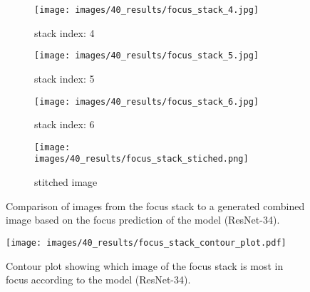 \begin{figure}
    \centering
    \begin{subfigure}[b]{\textwidth}
        \centering
        \caption{stack index: 4}
        \texttt{[image: images/40\_results/focus\_stack\_4.jpg]}
        \label{fig:Results:Stack:SideBySide:Index0}
    \end{subfigure}
    \begin{subfigure}[b]{\textwidth}
        \centering
        \caption{stack index: 5}
        \texttt{[image: images/40\_results/focus\_stack\_5.jpg]}
        \label{fig:Results:Stack:SideBySide:Index1}
    \end{subfigure}
    \begin{subfigure}[b]{\textwidth}
        \centering
        \caption{stack index: 6}
        \texttt{[image: images/40\_results/focus\_stack\_6.jpg]}
        \label{fig:Results:Stack:SideBySide:Index2}
    \end{subfigure}
    \begin{subfigure}[b]{\textwidth}
        \centering
        \caption{stitched image}
        \texttt{[image: images/40\_results/focus\_stack\_stiched.png]}
        \label{fig:Results:Stack:SideBySide:Stiched}
    \end{subfigure}
    \caption{Comparison of images from the focus stack to a generated combined image based on the focus prediction of the model (ResNet-34).}
    \label{fig:Results:Stack:SideBySide}
\end{figure}

\begin{figure}
    \centering
    \texttt{[image: images/40\_results/focus\_stack\_contour\_plot.pdf]}
    \caption{Contour plot showing which image of the focus stack is most in focus according to the model (ResNet-34).}
    \label{fig:Results:Stack:ContourPlot}
\end{figure}

